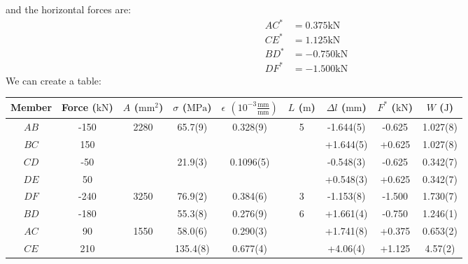 \documentclass{article}
\begin{document}
and the horizontal forces are:
\begin{align}
    AC^*&=0.375\si{\kilo\newton} \\ 
    CE^*&=1.125\si{\kilo\newton} \\ 
    BD^*&=-0.750\si{\kilo\newton} \\ 
    DF^*&=-1.500\si{\kilo\newton}
\end{align}
We can create a table:
\begin{center}
    \begin{tabular}{|c|c|c|c|c|c|c|c|c|}
        \hline
        Member &
          Force ($\si{\kilo\newton}$) &
          $A$ ($\si{\milli\meter\squared}$) &
          $\sigma$ ($\si{\mega\pascal}$) &
          $\epsilon$ $\left(10^{-3}\frac{\si{\milli\meter}}{\si{\milli\meter}}\right)$ &
          $L$ ($\si{\meter}$) &
          $\Delta l$ ($\si{\milli\meter}$) &
          $F^*$ ($\si{\kilo\newton}$) &
          $W$ ($\si{\joule}$) \\ \hline
        $AB$ & -150  & \multirow{4}{*}{2280} & \multirow{2}{*}{65.7(9)}  & \multirow{2}{*}{0.328(9)}  & \multirow{4}{*}{5} & -1.644(5) & -0.625 & 1.027(8) \\ \cline{1-2} \cline{7-9} 
        $BC$ & 150   &                       &                           &                            &                    & +1.644(5) & +0.625 & 1.027(8) \\ \cline{1-2} \cline{4-5} \cline{7-9} 
        $CD$ & -50   &                       & \multirow{2}{*}{21.9(3)}  & \multirow{2}{*}{0.1096(5)} &                    & -0.548(3) & -0.625 & 0.342(7) \\ \cline{1-2} \cline{7-9} 
        $DE$ & 50    &                       &                           &                            &                    & +0.548(3) & +0.625 & 0.342(7) \\ \hline
        $DF$ & -240  & \multirow{2}{*}{3250} & 76.9(2)                   & 0.384(6)                   &                3   & -1.153(8) & -1.500 & 1.730(7) \\ \cline{1-2} \cline{4-9} 
        $BD$ & -180  &                       & 55.3(8)                   & 0.276(9)                   & \multirow{3}{*}{6} & +1.661(4) & -0.750 & 1.246(1) \\ \cline{1-5} \cline{7-9} 
        $AC$ & 90    & \multirow{2}{*}{1550} & 58.0(6)                   & 0.290(3)                   &                    & +1.741(8) & +0.375 & 0.653(2) \\ \cline{1-2} \cline{4-5} \cline{7-9} 
        $CE$ & 210   &                       & 135.4(8)                  & 0.677(4)                   &                    & +4.06(4)  & +1.125 & 4.57(2) \\ \hline
    \end{tabular}
\end{center}
\end{document}
